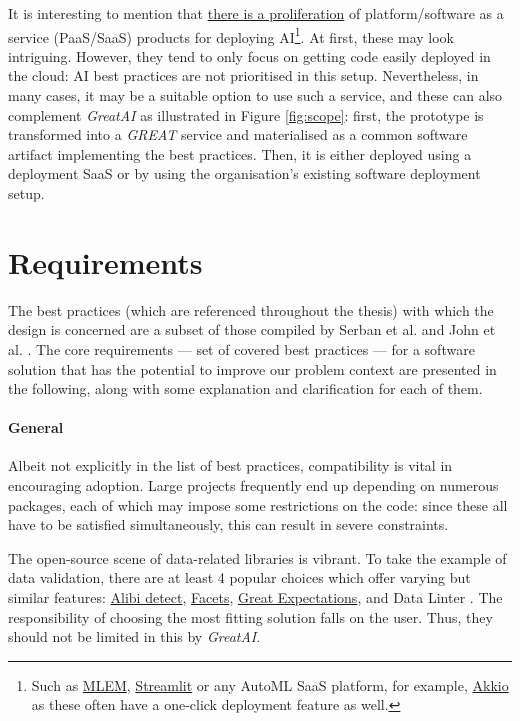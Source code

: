 It is interesting to mention that \href{https://xkcd.com/927/}{there is a proliferation} of platform/software as a service (PaaS/SaaS) products for deploying AI\footnote{Such as \href{https://mlem.ai/}{MLEM}, \href{https://streamlit.io/cloud}{Streamlit} or any AutoML SaaS platform, for example, \href{https://www.akkio.com/role/software-engineers}{Akkio} as these often have a one-click deployment feature as well.}. At first, these may look intriguing. However, they tend to only focus on getting code easily deployed in the cloud: AI best practices are not prioritised in this setup. Nevertheless, in many cases, it may be a suitable option to use such a service, and these can also complement \textit{GreatAI} as illustrated in Figure \ref{fig:scope}: first, the prototype is transformed into a \textit{GREAT} service and materialised as a common software artifact implementing the best practices. Then, it is either deployed using a deployment SaaS or by using the organisation's existing software deployment setup.

\section{Requirements} \label{section:requirements}

The best practices (which are referenced throughout the thesis) with which the design is concerned are a subset of those compiled by Serban et al. \cite{serban2020adoption,serban2021practices} and John et al. \cite{john2020architecting}. The core requirements --- set of covered best practices --- for a software solution that has the potential to improve our problem context are presented in the following, along with some explanation and clarification for each of them.

\paragraph{General} Albeit not explicitly in the list of best practices, compatibility is vital in encouraging adoption. Large projects frequently end up depending on numerous packages, each of which may impose some restrictions on the code: since these all have to be satisfied simultaneously, this can result in severe constraints. 

The open-source scene of data-related libraries is vibrant. To take the example of data validation, there are at least 4 popular choices which offer varying but similar features: \href{https://github.com/SeldonIO/alibi-detect}{Alibi detect}, \href{https://github.com/PAIR-code/facets}{Facets}, \href{https://github.com/great-expectations/great_expectations}{Great Expectations}, and Data Linter \cite{hynes2017data}. The responsibility of choosing the most fitting solution falls on the user. Thus, they should not be limited in this by \textit{GreatAI}. 

